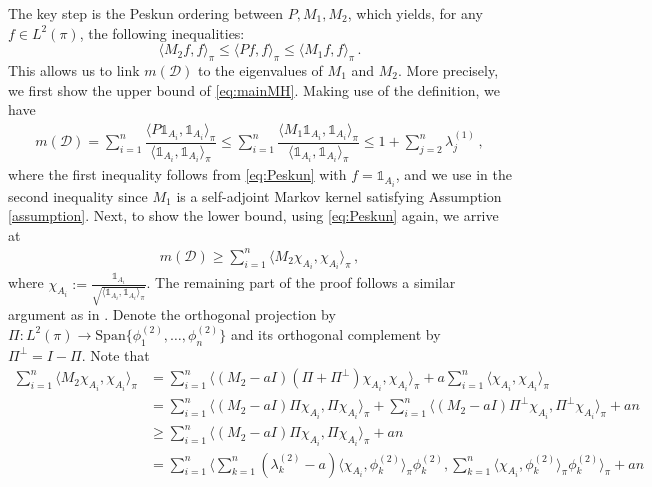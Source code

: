 \documentclass[12pt,a4]{amsart}
\numberwithin{equation}{section}
\theoremstyle{plain}
\theoremstyle{definition}
\theoremstyle{remark}
\let\oldendproof\endproof
\renewenvironment{proof}[1][\proofname]{%
  \oldproof[\noindent\textbf{#1.} ]%
}{\oldendproof}
\newcommand{\1}{\mathds{1}}
\renewcommand{\leq}{\leqslant}
\renewcommand{\geq}{\geqslant}
\begin{document}
\begin{proof}[Proof of Theorem \ref{thm:mainMH}]
	The key step is the Peskun ordering between $P, M_1, M_2$, which yields, for any $f \in L^2(\pi)$, the following inequalities:
	\begin{equation}\label{eq:Peskun}
	\langle M_2 f,f \rangle_{\pi} \leq \langle Pf,f\rangle_{\pi} \leq \langle M_1f,f\rangle_{\pi}\,.
	\end{equation}
	This allows us to link $m(\mathcal{D})$ to the eigenvalues of $M_1$ and $M_2$. More precisely, we first show the upper bound of \eqref{eq:mainMH}. Making use of the definition, we have
	\begin{align*}
	m(\mathcal{D}) = \sum_{i=1}^n \dfrac{\langle P \1_{A_i}, \1_{A_i} \rangle_{\pi}}{\langle \1_{A_i}, \1_{A_i} \rangle_{\pi}} \leq \sum_{i=1}^n \dfrac{\langle M_1 \1_{A_i}, \1_{A_i} \rangle_{\pi}}{\langle \1_{A_i}, \1_{A_i} \rangle_{\pi}} \leq  1 + \sum_{j=2}^n \lambda_j^{(1)}\,,
	\end{align*}
	where the first inequality follows from \eqref{eq:Peskun} with $f = \1_{A_i}$, and we use \cite[Theorem $2$]{HS06} in the second inequality since $M_1$ is a self-adjoint Markov kernel satisfying Assumption \ref{assumption}. Next, to show the lower bound, using \eqref{eq:Peskun} again, we arrive at
	\begin{align*}
	m(\mathcal{D}) \geq \sum_{i=1}^n \langle M_{2} \chi_{A_i}, \chi_{A_i} \rangle_{\pi}\,,
	\end{align*}
	where $\chi_{A_i} := \frac{\1_{A_i}}{\sqrt{\langle \1_{A_i}, \1_{A_i} \rangle_{\pi}}}$. The remaining part of the proof follows a similar argument as in \cite{HS06}. Denote the orthogonal projection by $\Pi : L^2(\pi) \rightarrow \mathrm{Span}\{\phi^{(2)}_1,\ldots,\phi^{(2)}_n\}$ and its orthogonal complement by $\Pi^{\perp} = I - \Pi$. Note that
	\begin{align*}
	\sum_{i=1}^n \langle M_{2} \chi_{A_i}, \chi_{A_i} \rangle_{\pi} &= \sum_{i=1}^n \langle (M_{2} -a I)(\Pi + \Pi^{\perp}) \chi_{A_i}, \chi_{A_i} \rangle_{\pi} + a \sum_{i=1}^n \langle \chi_{A_i}, \chi_{A_i} \rangle_{\pi} \\
	&= \sum_{i=1}^n \langle (M_{2} -a I)\Pi \chi_{A_i}, \Pi \chi_{A_i} \rangle_{\pi} + \sum_{i=1}^n \langle (M_{2} -a I)\Pi^{\perp} \chi_{A_i}, \Pi^{\perp} \chi_{A_i} \rangle_{\pi} + a n \\
	&\geq \sum_{i=1}^n \langle (M_{2} -a I)\Pi \chi_{A_i}, \Pi \chi_{A_i} \rangle_{\pi} + a n \\
	&= \sum_{i=1}^n \bigg\langle \sum_{k=1}^n (\lambda_k^{(2)} - a) \langle \chi_{A_i},\phi_k^{(2)} \rangle_{\pi} \phi_k^{(2)}, \sum_{k=1}^n \langle \chi_{A_i},\phi_k^{(2)} \rangle_{\pi} \phi_k^{(2)} \bigg\rangle_{\pi} + a n \\

\end{align*}
\end{proof}
\end{document}
